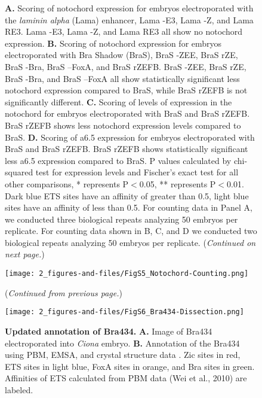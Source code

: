 \begin{figure}[p]
    \centering
    \caption[Scoring of manipulated notochord enhancers]{\textbf{A.} Scoring of notochord expression for embryos electroporated with the \textit{laminin alpha} (Lama) enhancer, Lama -E3, Lama -Z, and Lama RE3. Lama -E3, Lama -Z, and Lama RE3 all show no notochord expression. \textbf{B.} Scoring of notochord expression for embryos electroporated with Bra Shadow (BraS), BraS -ZEE, BraS rZE, BraS -Bra, BraS –FoxA, and BraS rZEFB. BraS -ZEE, BraS rZE, BraS -Bra, and BraS –FoxA all show statistically significant less notochord expression compared to BraS, while BraS rZEFB is not significantly different. \textbf{C.} Scoring of levels of expression in the notochord for embryos electroporated with BraS and BraS rZEFB. BraS rZEFB shows less notochord expression levels compared to BraS. \textbf{D.} Scoring of a6.5 expression for embryos electroporated with BraS and BraS rZEFB. BraS rZEFB shows statistically significant less a6.5 expression compared to BraS. P values calculated by chi-squared test for expression levels and Fischer’s exact test for all other comparisons, * represents P$<$0.05, ** represents P$<$0.01. Dark blue ETS sites have an affinity of greater than 0.5, light blue sites have an affinity of less than 0.5. For counting data in Panel A, we conducted three biological repeats analyzing 50 embryos per replicate. For counting data shown in B, C, and D we conducted two biological repeats analyzing 50 embryos per replicate. (\textit{Continued on next page.})}
    \label{fig:supplement manipulated enhancers}
\end{figure}

\addtocounter{figure}{-1}

\captionsetup[figure]{list=no}
\begin{figure}[p]
    \texttt{[image: 2\_figures-and-files/FigS5\_Notochord-Counting.png]}
    \caption{(\textit{Continued from previous page.})}
\end{figure}
\captionsetup[figure]{list=yes}

\begin{figure}[p]
    \centering
    \texttt{[image: 2\_figures-and-files/FigS6\_Bra434-Dissection.png]}
    \caption[Updated annotation of Bra434]{\textbf{Updated annotation of Bra434.} \textbf{A.} Image of Bra434 electroporated into \textit{Ciona} embryo. \textbf{B.} Annotation of the Bra434 using PBM, EMSA, and crystal structure data . Zic sites in red, ETS sites in light blue, FoxA sites in orange, and Bra sites in green. Affinities of ETS calculated from PBM data (Wei et al., 2010) are labeled.}
    \label{fig:supplement bra434 annotated}
\end{figure}
